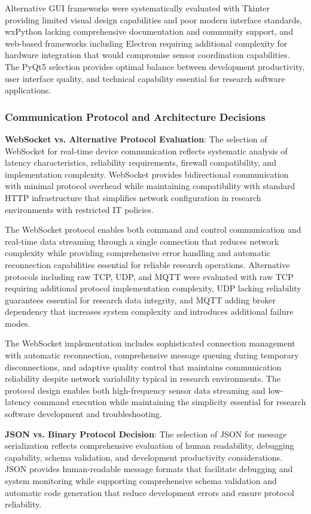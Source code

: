 \documentclass[11pt,a4paper]{article}
\begin{document}
Alternative GUI frameworks were systematically evaluated with Tkinter providing limited visual design capabilities and
poor modern interface standards, wxPython lacking comprehensive documentation and community support, and web-based
frameworks including Electron requiring additional complexity for hardware integration that would compromise sensor
coordination capabilities. The PyQt5 selection provides optimal balance between development productivity, user interface
quality, and technical capability essential for research software applications.

\subsubsection{Communication Protocol and Architecture Decisions}

\textbf{WebSocket vs. Alternative Protocol Evaluation}: The selection of WebSocket for real-time device communication
reflects systematic analysis of latency characteristics, reliability requirements, firewall compatibility, and
implementation complexity. WebSocket provides bidirectional communication with minimal protocol overhead while
maintaining compatibility with standard HTTP infrastructure that simplifies network configuration in research
environments with restricted IT policies.

The WebSocket protocol enables both command and control communication and real-time data streaming through a single
connection that reduces network complexity while providing comprehensive error handling and automatic reconnection
capabilities essential for reliable research operations. Alternative protocols including raw TCP, UDP, and MQTT were
evaluated with raw TCP requiring additional protocol implementation complexity, UDP lacking reliability guarantees
essential for research data integrity, and MQTT adding broker dependency that increases system complexity and introduces
additional failure modes.

The WebSocket implementation includes sophisticated connection management with automatic reconnection, comprehensive
message queuing during temporary disconnections, and adaptive quality control that maintains communication reliability
despite network variability typical in research environments. The protocol design enables both high-frequency sensor
data streaming and low-latency command execution while maintaining the simplicity essential for research software
development and troubleshooting.

\textbf{JSON vs. Binary Protocol Decision}: The selection of JSON for message serialization reflects comprehensive evaluation
of human readability, debugging capability, schema validation, and development productivity considerations. JSON
provides human-readable message formats that facilitate debugging and system monitoring while supporting comprehensive
schema validation and automatic code generation that reduce development errors and ensure protocol reliability.
\end{document}
